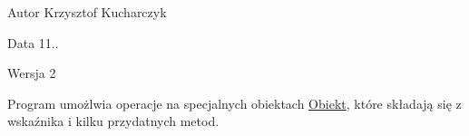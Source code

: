 \begin{DoxyAuthor}{\-Autor}
\-Krzysztof \-Kucharczyk 
\end{DoxyAuthor}
\begin{DoxyDate}{\-Data}
11.. 
\end{DoxyDate}
\begin{DoxyVersion}{\-Wersja}
2
\end{DoxyVersion}
\-Program umożlwia operacje na specjalnych obiektach \hyperlink{class_obiekt}{\-Obiekt}, które składają się z wskaźnika i kilku przydatnych metod. 